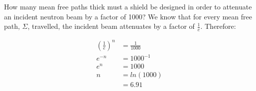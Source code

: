 \documentclass{hw}
\begin{document}
	How many mean free paths thick must a shield be designed in order to attenuate an incident neutron beam by a factor of 1000?
\solution
	We know that for every mean free path, $ \Sigma $, travelled, the incident beam attenuates by a factor of $ \frac{1}{e} $. Therefore:
	
	\begin{align}
		\left(\frac{1}{e}\right)^n &= \frac{1}{1000} \\
		e^{-n} &= 1000^{-1} \\
		e^n &= 1000 \\
		n &= ln(1000) \\
		&= 6.91
	\end{align}
\end{document}
